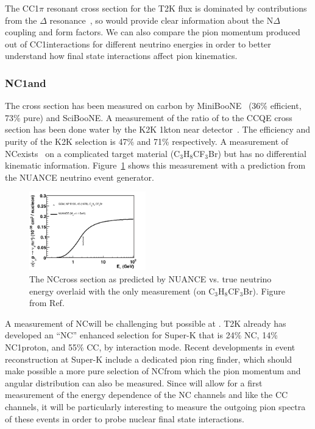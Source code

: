 The CC1$\pi$ resonant cross section for the T2K flux is dominated by contributions from the $\Delta$ resonance~\cite{Lalakulich:2013iaa}, so \nuprismlite would provide clear information about the N$\Delta$ coupling and form factors. We can also compare the pion momentum produced out of CC1\pip interactions for different neutrino energies in order to better understand how final state interactions affect pion kinematics.



\subsubsection{NC1\pip and \ncpi}

The \ncpi  cross section has been measured on carbon by MiniBooNE~\cite{AguilarArevalo:2009ww} (36\% efficient, 73\% pure) and SciBooNE. A measurement of the ratio of \ncpi to the CCQE cross section has been done water by the K2K 1kton near detector~\cite{Nakayama:2004dp}. The efficiency and purity of the K2K selection is 47\% and 71\% respectively. A measurement of NC\pip exists~\cite{hawker} on a complicated target material (C$_3$H$_8$CF$_3$Br) but has no differential kinematic information. Figure~\ref{fig:ncpip} shows this measurement with a prediction from the NUANCE neutrino event generator.  

\begin{figure}[htpb]
\begin{center}
      \includegraphics[width=0.45\textwidth] {figures/plot_ncpip_nu.pdf}
\end{center}
\caption{The NC\pip  cross section as predicted by NUANCE vs. true neutrino energy overlaid with the only measurement (on C$_3$H$_8$CF$_3$Br). Figure from Ref.~\cite{Formaggio:2013kya}}
\label{fig:ncpip}
\end{figure}

A measurement of NC\pip will be challenging but possible at \nuprismlite. T2K already has developed an ``NC'' enhanced selection for Super-K that is 24\% NC\pip, 14\% NC1proton, and 55\% CC\numu, by interaction mode. Recent developments in event reconstruction at Super-K include a dedicated pion ring finder, which should make possible a more pure selection of NC\pip from which the pion momentum and angular distribution can also be measured. Since \nuprismlite will allow for a first measurement of the energy dependence of the NC channels and like the CC channels, it will be particularly interesting to measure the outgoing pion spectra of these events in order to probe nuclear final state interactions.

